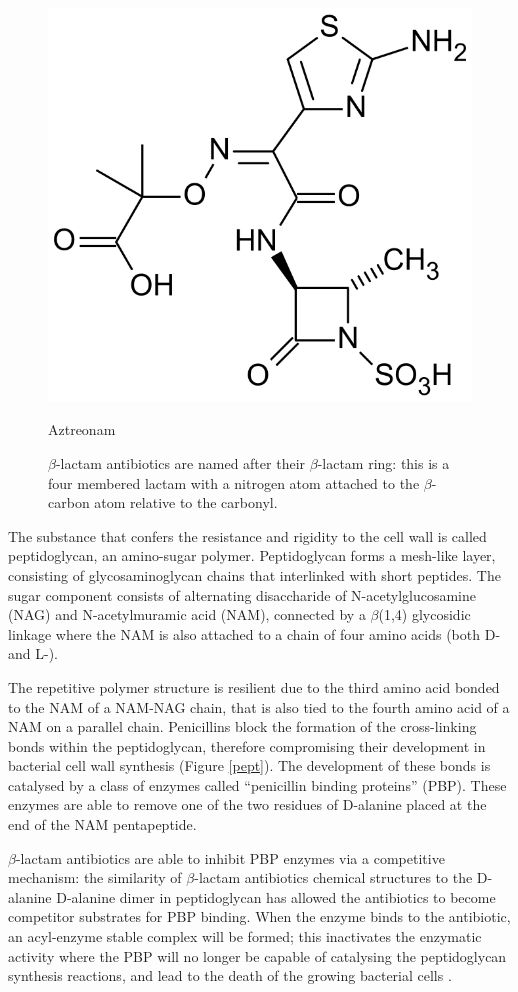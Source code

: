 \documentclass[11pt]{report}
\begin{document}
\begin{figure}[ht]
  \noindent\begin{minipage}[b]{0.5\linewidth}
    \includegraphics[width=.5\linewidth]{img/aztreonam.png} 
    \caption*{Aztreonam} 
  \end{minipage}%
  \caption{$\beta$-lactam antibiotics are named after their $\beta$-lactam ring: this is a four membered lactam with a nitrogen atom attached to the $\beta$-carbon atom relative to the carbonyl.}
 \label{beta_lact}
\end{figure}


The substance that confers the resistance and rigidity to the cell wall is called peptidoglycan, an amino-sugar polymer.
Peptidoglycan forms a mesh-like layer, consisting of glycosaminoglycan chains that interlinked with short peptides.
The sugar component consists of alternating disaccharide of N-acetylglucosamine (NAG) and N-acetylmuramic acid (NAM), connected by a $\beta$(1,4) glycosidic linkage where the NAM is also attached to a chain of four amino acids (both D- and L-).

The repetitive polymer structure is resilient due to the third amino acid bonded to the NAM of a NAM-NAG chain, that is also tied to the fourth amino acid of a NAM on a parallel chain.
Penicillins block the formation of the cross-linking bonds within the peptidoglycan, therefore compromising their development in bacterial cell wall synthesis (Figure \ref{pept}).
The development of these bonds is catalysed by a class of enzymes called ``penicillin binding proteins'' (PBP).
These enzymes are able to remove one of the two residues of D-alanine placed at the end of the NAM pentapeptide.

$\beta$-lactam antibiotics are able to inhibit PBP enzymes via a competitive mechanism: the similarity of $\beta$-lactam antibiotics chemical structures to the D-alanine D-alanine dimer in peptidoglycan has allowed the antibiotics to become competitor substrates for PBP binding.
When the enzyme binds to the antibiotic, an acyl-enzyme stable complex will be formed; this inactivates the enzymatic activity where the PBP will no longer be capable of catalysing the peptidoglycan synthesis reactions, and lead to the death of the growing bacterial cells \cite{kong2010beta}.
\end{document}
